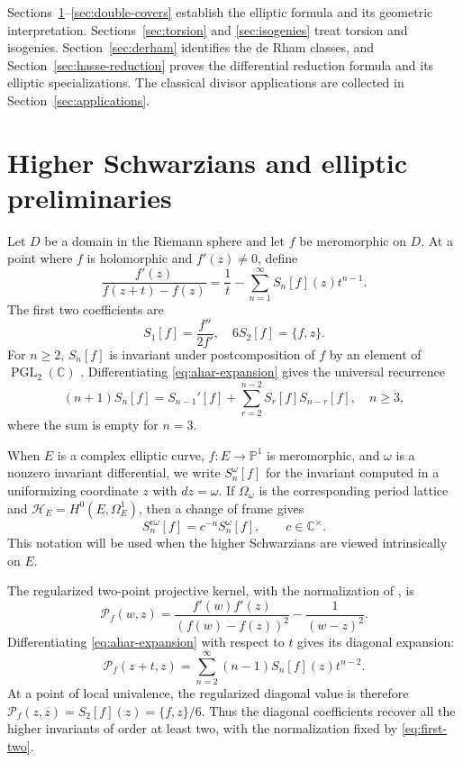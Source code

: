 \documentclass[11pt]{amsart}
\theoremstyle{definition}
\theoremstyle{remark}
\numberwithin{equation}{section}
\begin{document}
Sections~\ref{sec:preliminaries}--\ref{sec:double-covers} establish the
elliptic formula and its geometric interpretation.
Sections~\ref{sec:torsion} and \ref{sec:isogenies} treat torsion and
isogenies. Section~\ref{sec:derham} identifies the de Rham classes,
and Section~\ref{sec:hasse-reduction} proves the differential reduction
formula and its elliptic specializations. The classical divisor
applications are collected in Section~\ref{sec:applications}.

\section{Higher Schwarzians and elliptic preliminaries}\label{sec:preliminaries}

Let $D$ be a domain in the Riemann sphere and let $f$ be meromorphic on $D$. At a point where $f$ is holomorphic and $f'(z)\neq0$, define
\begin{equation}\label{eq:ahar-expansion}
\frac{f'(z)}{f(z+t)-f(z)}
=
\frac1t-\sum_{n=1}^{\infty}S_n[f](z)t^{n-1}.
\end{equation}
The first two coefficients are
\begin{equation}\label{eq:first-two}
S_1[f]=\frac{f''}{2f'},
\quad
6S_2[f]=\{f,z\}.
\end{equation}
For $n\geq2$, $S_n[f]$ is invariant under postcomposition of $f$ by an element of $\operatorname{PGL}_2(\mathbb C)$ \cite{aharonov}. Differentiating \eqref{eq:ahar-expansion} gives the universal recurrence
\begin{equation}\label{eq:ahar-recurrence}
(n+1)S_n[f]
=
S_{n-1}'[f]
+\sum_{r=2}^{n-2}S_r[f]S_{n-r}[f],
\quad n\geq3,
\end{equation}
where the sum is empty for $n=3$.

When $E$ is a complex elliptic curve, $f:E\to\mathbb P^1$ is meromorphic, and $\omega$ is a nonzero invariant differential, we write $S_n^\omega[f]$ for the invariant computed in a uniformizing coordinate $z$ with $dz=\omega$. If $\Omega_\omega$ is the corresponding period lattice and $\mathcal H_E=H^0(E,\Omega_E^1)$, then a change of frame gives
\begin{equation}\label{eq:scaling-Sn}
S_n^{c\omega}[f]=c^{-n}S_n^\omega[f],\qquad c\in\mathbb C^\times.
\end{equation}
This notation will be used when the higher Schwarzians are viewed intrinsically on $E$.

The regularized two-point projective kernel, with the normalization of \cite[Eq.~(2.3)]{saber-sebbar}, is
\[
\mathcal P_f(w,z)
=
\frac{f'(w)f'(z)}{(f(w)-f(z))^2}-\frac1{(w-z)^2}.
\]
Differentiating \eqref{eq:ahar-expansion} with respect to $t$ gives its diagonal expansion:
\[
\mathcal P_f(z+t,z)
=
\sum_{n=2}^{\infty}(n-1)S_n[f](z)t^{n-2}.
\]
At a point of local univalence, the regularized diagonal value is therefore
$\mathcal P_f(z,z)=S_2[f](z)=\{f,z\}/6$. Thus the diagonal coefficients recover all the higher invariants of order at least two, with the normalization fixed by \eqref{eq:first-two}.
\end{document}
